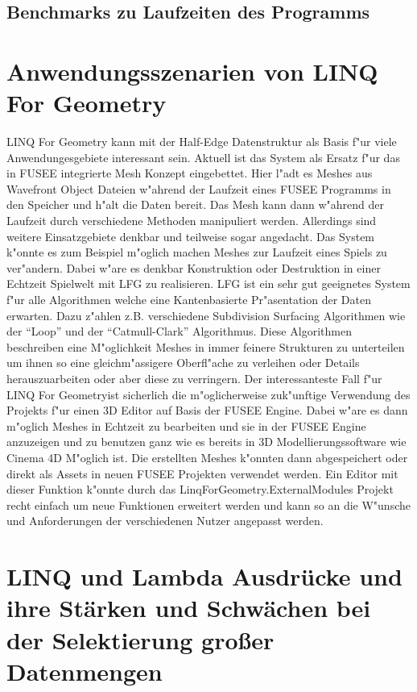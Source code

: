 \documentclass[pagesize, paper=a4, fontsize=12pt,titlepage=true, headings=small, headnosepline, abstractoff, liststotoc, nochapterprefix, plainheadsepline]{scrreprt}
\newcommand{\LFG}{LINQ For Geometry}
\newcommand{\LFGS}{LINQ For Geometry }
\newcommand{\HES}{Half-Edge Datenstruktur }
\begin{document}
		\subsection {Benchmarks zu Laufzeiten des Programms}
	\section {Anwendungsszenarien von \LFG}
	\LFGS kann mit der \HES als Basis f"ur viele Anwendungesgebiete interessant sein. Aktuell ist das System als Ersatz f"ur das in FUSEE integrierte Mesh Konzept eingebettet. Hier l"adt es Meshes aus Wavefront Object Dateien w"ahrend der Laufzeit eines FUSEE Programms in den Speicher und h"alt die Daten bereit. Das Mesh kann dann w"ahrend der Laufzeit durch verschiedene Methoden manipuliert werden. Allerdings sind weitere Einsatzgebiete denkbar und teilweise sogar angedacht.
Das System k"onnte es zum Beispiel m"oglich machen Meshes zur Laufzeit eines Spiels zu ver"andern. Dabei w"are es denkbar Konstruktion oder Destruktion in einer Echtzeit Spielwelt mit LFG zu realisieren. LFG ist ein sehr gut geeignetes System f"ur alle Algorithmen welche eine Kantenbasierte Pr"asentation der Daten erwarten. Dazu z"ahlen z.B. verschiedene Subdivision Surfacing Algorithmen wie der "`Loop"' und der "`Catmull-Clark"' Algorithmus. Diese Algorithmen beschreiben eine M"oglichkeit Meshes in immer feinere Strukturen zu unterteilen um ihnen so eine gleichm"assigere Oberfl"ache zu verleihen oder Details herauszuarbeiten oder aber diese zu verringern.
Der interessanteste Fall f"ur \LFG ist sicherlich die m"oglicherweise zuk"unftige Verwendung des Projekts f"ur einen 3D Editor auf Basis der FUSEE Engine. Dabei w"are es dann m"oglich Meshes in Echtzeit zu bearbeiten und sie in der FUSEE Engine anzuzeigen und zu benutzen ganz wie es bereits in 3D Modellierungssoftware wie Cinema 4D M"oglich ist. Die erstellten Meshes k"onnten dann abgespeichert oder direkt als Assets in neuen FUSEE Projekten verwendet werden. Ein Editor mit dieser Funktion k"onnte durch das LinqForGeometry.ExternalModules Projekt recht einfach um neue Funktionen erweitert werden und kann so an die W"unsche und Anforderungen der verschiedenen Nutzer angepasst werden.
	\section {LINQ und Lambda Ausdrücke und ihre Stärken und Schwächen bei der Selektierung großer Datenmengen}
\end{document}
